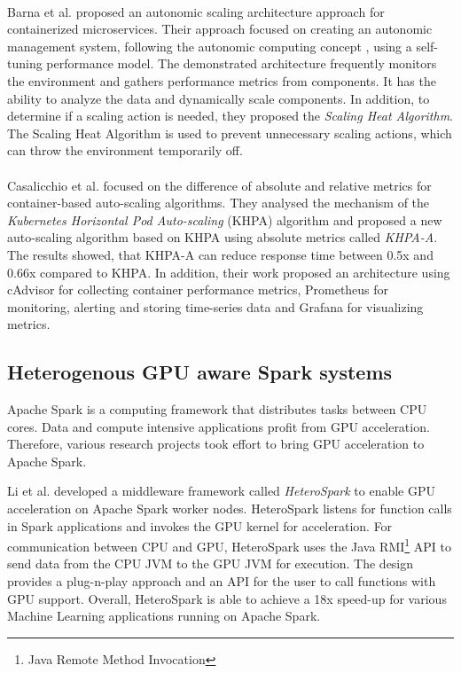 \paragraph{}Barna et al. \cite{Barna2017ElasticContainerApps} proposed an autonomic scaling architecture approach for containerized microservices. Their approach focused on creating an autonomic management system, following the autonomic computing concept \cite{Kephart2003VisionComputing}, using a self-tuning performance model. The demonstrated architecture frequently monitors the environment and gathers performance metrics from components. It has the ability to analyze the data and dynamically scale components. In addition, to determine if a scaling action is needed, they proposed the \textit{Scaling Heat Algorithm}. The Scaling Heat Algorithm is used to prevent unnecessary scaling actions, which can throw the environment temporarily off.


\paragraph{}Casalicchio et al. \cite{Casalicchio2017AutoScaleCont} focused on the difference of absolute and relative metrics for container-based auto-scaling algorithms. They analysed the mechanism of the \textit{Kubernetes Horizontal Pod Auto-scaling} (KHPA) algorithm and proposed a new auto-scaling algorithm based on KHPA using absolute metrics called \textit{KHPA-A}. The results showed, that KHPA-A can reduce response time between 0.5x and 0.66x compared to KHPA. In addition, their work proposed an architecture using cAdvisor for collecting container performance metrics, Prometheus for monitoring, alerting and storing time-series data and Grafana for visualizing metrics.


\subsection{Heterogenous GPU aware Spark systems}
Apache Spark is a computing framework that distributes tasks between CPU cores. Data and compute intensive applications profit from GPU acceleration. Therefore, various research projects took effort to bring GPU acceleration to Apache Spark.


Li et al. \cite{Li2015HeteroSpark} developed a middleware framework called \textit{HeteroSpark} to enable GPU acceleration on Apache Spark worker nodes. HeteroSpark listens for function calls in Spark applications and invokes the GPU kernel for acceleration. For communication between CPU and GPU, HeteroSpark uses the Java RMI\footnote{Java Remote Method Invocation} API to send data from the CPU JVM to the GPU JVM for execution.
The design provides a plug-n-play approach and an API for the user to call functions with GPU support.
Overall, HeteroSpark is able to achieve a 18x speed-up for various Machine Learning applications running on Apache Spark.


